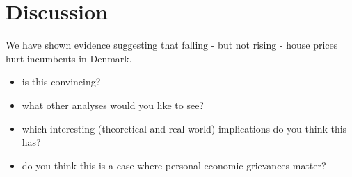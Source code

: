 \documentclass[aspectratio=169]{beamer}
\begin{document}
\section{Discussion}

	\begin{frame}
	We have shown evidence suggesting that falling - but not rising - house prices hurt incumbents in Denmark.
	
	\vspace{0.2in} \pause
	
	\begin{itemize}
		\item is this convincing?
		\item what other analyses would you like to see?
		\item which interesting (theoretical and real world) implications do you think this has?
		\item do you think this is a case where personal economic grievances matter? 
	\end{itemize}	
		
	\end{frame}		

\begin{frame}
	
		
\end{frame}
\end{document}
